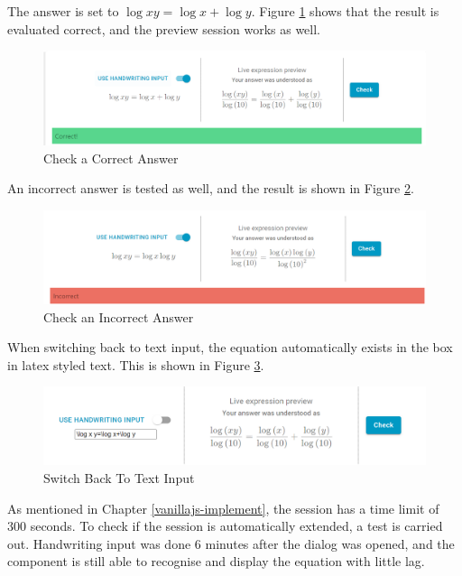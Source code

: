 \documentclass[12pt,twoside]{report}
\begin{document}
The answer is set to $\log x y=\log x+\log y$. Figure
\ref{fig:test-check-correct} shows that the result is evaluated correct, and the
preview session works as well.
\begin{figure}[H]
    \centering
    \includegraphics[width=\linewidth, frame]{figures/test-check-correct}
    \caption{Check a Correct Answer}
    \label{fig:test-check-correct}
\end{figure}

An incorrect answer is tested as well, and the result is shown in Figure \ref{fig:test-check-wrong}.
\begin{figure}[h]
    \centering
    \includegraphics[width=\linewidth, frame]{figures/test-check-wrong.png}
    \caption{Check an Incorrect Answer}
    \label{fig:test-check-wrong}
\end{figure}

When switching back to text input, the equation automatically exists in the box in latex styled text. This is shown in Figure \ref{fig:test-switch-back}.
\begin{figure}
    \centering
    \includegraphics[width=\linewidth, frame]{figures/test-switch-back.png}
    \caption{Switch Back To Text Input}
    \label{fig:test-switch-back}
\end{figure}

As mentioned in Chapter \ref{vanillajs-implement}, the session has a time limit
of 300 seconds. To check if the session is automatically extended, a test is
carried out. Handwriting input was done 6 minutes after the dialog was opened,
and the component is still able to recognise and display the equation with
little lag.
\\
\end{document}
